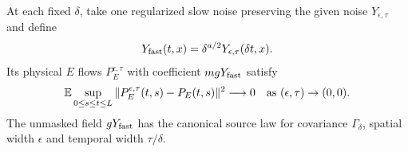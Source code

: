 \begin{lemma}\label{L:point-fast-sources}
  At each fixed $\delta$, take one regularized slow noise preserving the given
  noise $Y_{\epsilon,\tau}$ and define
  \[
    Y_{\rm fast}(t,x)=\delta^{a/2}Y_{\epsilon,\tau}(\delta t,x).
  \]
  Its physical $E$ flows $P_E^{\epsilon,\tau}$ with coefficient $m gY_{\rm
  fast}$ satisfy
  \begin{equation}\label{E:point-source-flow-limit}
    \mathbb{E}\sup_{0\le s\le t\le L}
    \|P_E^{\epsilon,\tau}(t,s)-P_E(t,s)\|^2\longrightarrow0
    \quad\hbox{as }(\epsilon,\tau)\to(0,0).
  \end{equation}
  The unmasked field $gY_{\rm fast}$ has the canonical source law for covariance
  $\Gamma_\delta$, spatial width $\epsilon$ and temporal width $\tau/\delta$.
\end{lemma}

